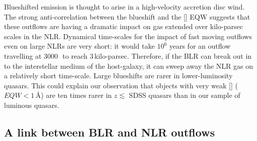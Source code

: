 Blueshifted  emission is thought to arise in a high-velocity accretion disc wind.
The strong anti-correlation between the  blueshift and the [] EQW suggests that these outflows are having a dramatic impact on gas extended over kilo-parsec scales in the NLR.
Dynamical time-scales for the impact of fast moving outflows even on large NLRs are very short: it would take $10^6$ years for an outflow travelling at $3000$\,\kms\, to reach $3$\,kilo-parsec. 
Therefore, if the BLR can break out in to the interstellar medium of the host-galaxy, it can sweep away the NLR gas on a relatively short time-scale.
Large  blueshifts are rarer in lower-luminosity quasars. 
This could explain our observation that objects with very weak [] ($EQW < 1$\,\AA) are ten times rarer in $z\lesssim$ SDSS quasars than in our sample of luminous quasars.   

\subsection{A link between BLR and NLR outflows}

